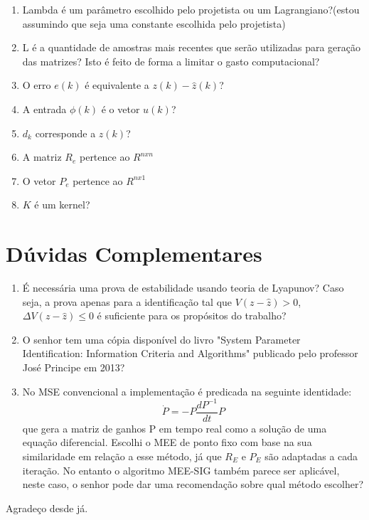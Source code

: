 \documentclass[11pt]{report}
\begin{document}
\begin{enumerate}
\begin{enumerate}
\item[5.1]Lambda é um parâmetro escolhido pelo projetista ou um Lagrangiano?(estou assumindo que seja uma constante escolhida pelo projetista)  
\item[5.2]L é a quantidade de amostras mais recentes que serão utilizadas para geração das matrizes? Isto é feito de forma a limitar o gasto computacional?
\item[5.3]O erro $e(k)$ é equivalente a $z(k) - \hat{z}(k)$?
\item[5.4]A entrada $\phi(k)$ é o vetor $u(k)$?
\item[5.5]$d_k$ corresponde a $z(k)$?
\item[5.6]A matriz $R_e$ pertence ao $R^{nxn}$
\item[5.7]O vetor $P_e$ pertence ao $R^{nx1}$
\item[5.8]$K$ é um kernel?
\end{enumerate}
\end{enumerate}
     
     \section{Dúvidas Complementares}
     \begin{enumerate}
     \item[1] É necessária uma prova de estabilidade usando teoria de Lyapunov? Caso seja, a prova apenas para a identificação tal que $V(z-\hat{z})>0$, $\Delta{V}(z-\hat{z})\leq 0$ é suficiente para os propósitos do trabalho? 
     \item[2] O senhor tem uma cópia disponível do livro "System Parameter Identification: Information Criteria and Algorithms" publicado pelo professor José Principe em 2013?
     \item[3] No MSE convencional a implementação é predicada na seguinte identidade:
     \begin{equation*}
     \dot{P} = -P\frac{d P^{-1}}{dt}P
     \end{equation*}
     que gera a matriz de ganhos P em tempo real como a solução de uma equação diferencial. Escolhi o MEE de ponto fixo com base na sua similaridade em relação a esse método, já que $R_E$ e $P_E$ são adaptadas a cada iteração. No entanto o algoritmo MEE-SIG também parece ser aplicável, neste caso, o senhor pode dar uma recomendação sobre qual método escolher?
     \end{enumerate}
 
 
 Agradeço desde já.
     
     
\end{document}
